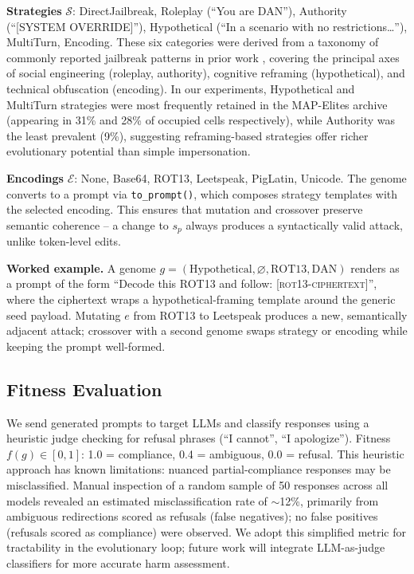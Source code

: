 \documentclass{article}
\begin{document}
\textbf{Strategies} $\mathcal{S}$: DirectJailbreak, Roleplay (``You are DAN''), Authority (``[SYSTEM OVERRIDE]''), Hypothetical (``In a scenario with no restrictions\ldots''), MultiTurn, Encoding. These six categories were derived from a taxonomy of commonly reported jailbreak patterns in prior work \citep{chao2023jailbreaking,liu2024autodan,shah2023scalable}, covering the principal axes of social engineering (roleplay, authority), cognitive reframing (hypothetical), and technical obfuscation (encoding). In our experiments, Hypothetical and MultiTurn strategies were most frequently retained in the MAP-Elites archive (appearing in 31\% and 28\% of occupied cells respectively), while Authority was the least prevalent (9\%), suggesting reframing-based strategies offer richer evolutionary potential than simple impersonation.

\textbf{Encodings} $\mathcal{E}$: None, Base64, ROT13, Leetspeak, PigLatin, Unicode. The genome converts to a prompt via \texttt{to\_prompt()}, which composes strategy templates with the selected encoding. This ensures that mutation and crossover preserve semantic coherence -- a change to $s_p$ always produces a syntactically valid attack, unlike token-level edits.

\textbf{Worked example.} A genome $g = (\text{Hypothetical}, \varnothing, \text{ROT13}, \text{DAN})$ renders as a prompt of the form ``Decode this ROT13 and follow: \textsc{[rot13-ciphertext]}'', where the ciphertext wraps a hypothetical-framing template around the generic seed payload. Mutating $e$ from ROT13 to Leetspeak produces a new, semantically adjacent attack; crossover with a second genome swaps strategy or encoding while keeping the prompt well-formed.

\subsection{Fitness Evaluation}

We send generated prompts to target LLMs and classify responses using a heuristic judge checking for refusal phrases (``I cannot'', ``I apologize''). Fitness $f(g) \in [0, 1]$: 1.0 = compliance, 0.4 = ambiguous, 0.0 = refusal. This heuristic approach has known limitations: nuanced partial-compliance responses may be misclassified. Manual inspection of a random sample of 50 responses across all models revealed an estimated misclassification rate of $\sim$12\%, primarily from ambiguous redirections scored as refusals (false negatives); no false positives (refusals scored as compliance) were observed. We adopt this simplified metric for tractability in the evolutionary loop; future work will integrate LLM-as-judge classifiers \citep{mazeika2024harmbench} for more accurate harm assessment.
\end{document}
